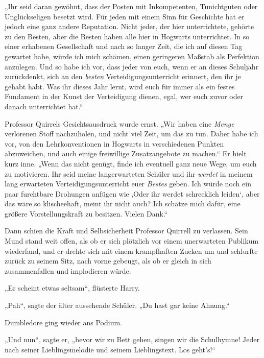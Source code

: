 „Ihr seid daran gewöhnt, dass der Posten mit Inkompetenten, Tunichtguten oder Unglückseligen besetzt wird. Für jeden mit einem Sinn für Geschichte hat er jedoch eine ganz andere Reputation. Nicht jeder, der hier unterrichtete, gehörte zu den Besten, aber die Besten haben alle hier in Hogwarts unterrichtet. In so einer erhabenen Gesellschaft und nach so langer Zeit, die ich auf diesen Tag gewartet habe, würde ich mich schämen, einen geringeren Maßstab als Perfektion anzulegen. Und so habe ich vor, dass jeder von euch, wenn er an dieses Schuljahr zurückdenkt, sich an den \emph{besten} Verteidigungsunterricht erinnert, den ihr je gehabt habt. Was ihr dieses Jahr lernt, wird euch für immer als ein festes Fundament in der Kunst der Verteidigung dienen, egal, wer euch zuvor oder danach unterrichtet hat.“

Professor Quirrels Gesichtsausdruck wurde ernst. „Wir haben eine \emph{Menge} verlorenen Stoff nachzuholen, und nicht viel Zeit, um das zu tun. Daher habe ich vor, von den Lehrkonventionen in Hogwarts in verschiedenen Punkten abzuweichen, und auch einige freiwillige Zusatzangebote zu machen.“ Er hielt kurz inne. „Wenn das nicht genügt, finde ich eventuell ganz neue Wege, um euch zu motivieren. Ihr seid meine langerwarteten Schüler und ihr \emph{werdet} in meinem lang erwarteten Verteidigungsunterricht euer \emph{Bestes} geben. Ich würde noch ein paar furchtbare Drohungen anfügen wie ‚Oder ihr werdet schrecklich leiden‘, aber das wäre so klischeehaft, meint ihr nicht auch? Ich schätze mich dafür, eine größere Vorstellungskraft zu besitzen. Vielen Dank.“

Dann schien die Kraft und Selbsicherheit Professor Quirrell zu verlassen. Sein Mund stand weit offen, als ob er sich plötzlich vor einem unerwarteten Publikum wiederfand, und er drehte sich mit einem krampfhaften Zucken um und schlurfte zurück zu seinem Sitz, nach vorne gebeugt, als ob er gleich in sich zusammenfallen und implodieren würde.

„Er scheint etwas seltsam“, flüsterte Harry.

„Pah“, sagte der älter aussehende Schüler. „Du hast gar keine Ahnung.“

Dumbledore ging wieder ans Podium.

„Und nun“, sagte er, „bevor wir zu Bett gehen, singen wir die Schulhymne! Jeder nach seiner Lieblingsmelodie und seinem Lieblingstext. Los geht's!“
